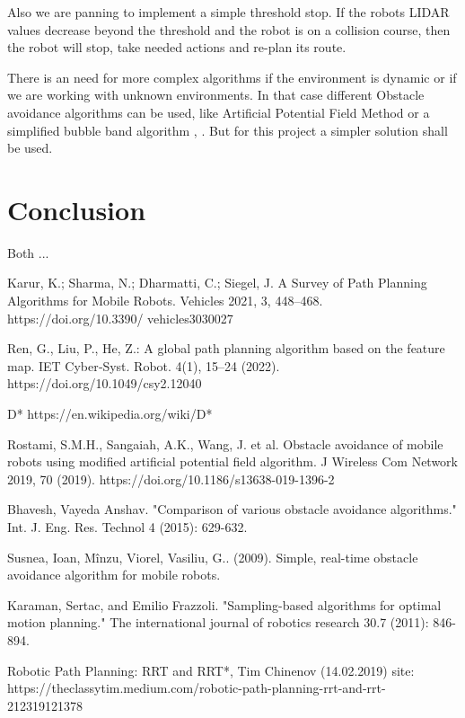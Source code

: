 \documentclass[12pt, a4paper, onecolumn]{article}
\begin{document}
Also we are panning to implement a simple threshold stop. If the robots LIDAR values decrease beyond the threshold and the robot is on a collision course, then the robot will stop, take needed actions and re-plan its route.  

There is an need for more complex algorithms if the environment is dynamic or if we are working with unknown environments. In that case different Obstacle avoidance algorithms can be used, like Artificial Potential Field Method \cite{Rostami19} or a simplified bubble band algorithm\cite{OA09} ,  \cite{OA15}. But for this project a simpler solution shall be used.

\section{Conclusion}

Both ... 
\newpage
\begin{thebibliography}{9}

Karur, K.; Sharma, N.;
Dharmatti, C.; Siegel, J. A Survey of
Path Planning Algorithms for Mobile
Robots. Vehicles 2021, 3, 448–468.
https://doi.org/10.3390/
vehicles3030027

Ren, G., Liu, P., He, Z.: A
global path planning algorithm based on the feature
map. IET Cyber‐Syst. Robot. 4(1), 15–24 (2022).
https://doi.org/10.1049/csy2.12040

D*
https://en.wikipedia.org/wiki/D*

Rostami, S.M.H., Sangaiah, A.K., Wang, J. et al. Obstacle avoidance of mobile robots using modified artificial potential field algorithm. J Wireless Com Network 2019, 70 (2019). https://doi.org/10.1186/s13638-019-1396-2

Bhavesh, Vayeda Anshav. "Comparison of various obstacle avoidance algorithms." Int. J. Eng. Res. Technol 4 (2015): 629-632.

Susnea, Ioan, Mînzu, Viorel, Vasiliu, G.. (2009). Simple, real-time obstacle avoidance algorithm for mobile robots. 

Karaman, Sertac, and Emilio Frazzoli. "Sampling-based algorithms for optimal motion planning." The international journal of robotics research 30.7 (2011): 846-894.

Robotic Path Planning: RRT and RRT*, Tim Chinenov (14.02.2019) site: https://theclassytim.medium.com/robotic-path-planning-rrt-and-rrt-212319121378

\end{thebibliography}
\end{document}
